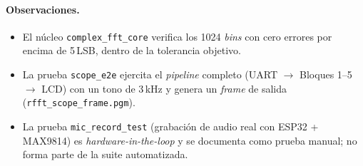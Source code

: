 \documentclass[11pt,a4paper]{article}
\begin{document}
\paragraph{Observaciones.}
\begin{itemize}[leftmargin=1.4em]
  \item El núcleo \texttt{complex\_fft\_core} verifica los 1024 \emph{bins} con
        cero errores por encima de 5\,LSB, dentro de la tolerancia objetivo.
  \item La prueba \texttt{scope\_e2e} ejercita el \emph{pipeline} completo
        (UART $\to$ Bloques 1--5 $\to$ LCD) con un tono de 3\,kHz y genera un
        \emph{frame} de salida (\texttt{rfft\_scope\_frame.pgm}).
  \item La prueba \texttt{mic\_record\_test} (grabación de audio real con
        ESP32 + MAX9814) es \emph{hardware-in-the-loop} y se documenta como
        prueba manual; no forma parte de la suite automatizada.
\end{itemize}
\end{document}
